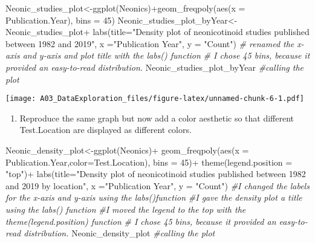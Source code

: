 \documentclass[
]{article}
\newenvironment{Shaded}{\begin{snugshade}}{\end{snugshade}}
\newcommand{\AttributeTok}[1]{\textcolor[rgb]{0.77,0.63,0.00}{#1}}
\newcommand{\CommentTok}[1]{\textcolor[rgb]{0.56,0.35,0.01}{\textit{#1}}}
\newcommand{\DecValTok}[1]{\textcolor[rgb]{0.00,0.00,0.81}{#1}}
\newcommand{\FunctionTok}[1]{\textcolor[rgb]{0.00,0.00,0.00}{#1}}
\newcommand{\NormalTok}[1]{#1}
\newcommand{\OtherTok}[1]{\textcolor[rgb]{0.56,0.35,0.01}{#1}}
\newcommand{\SpecialCharTok}[1]{\textcolor[rgb]{0.00,0.00,0.00}{#1}}
\newcommand{\StringTok}[1]{\textcolor[rgb]{0.31,0.60,0.02}{#1}}
\providecommand{\tightlist}{%
  \setlength{\itemsep}{0pt}\setlength{\parskip}{0pt}}
\begin{document}
\begin{Shaded}
\begin{Highlighting}[]
\NormalTok{Neonic\_studies\_plot}\OtherTok{\textless{}{-}}\FunctionTok{ggplot}\NormalTok{(Neonics)}\SpecialCharTok{+}\FunctionTok{geom\_freqpoly}\NormalTok{(}\FunctionTok{aes}\NormalTok{(}\AttributeTok{x =}\NormalTok{ Publication.Year), }\AttributeTok{bins =} \DecValTok{45}\NormalTok{)}
\NormalTok{Neonic\_studies\_plot\_byYear}\OtherTok{\textless{}{-}}\NormalTok{Neonic\_studies\_plot}\SpecialCharTok{+}
  \FunctionTok{labs}\NormalTok{(}\AttributeTok{title=}\StringTok{"Density plot of neonicotinoid studies published between 1982 and 2019"}\NormalTok{,}
  \AttributeTok{x =}\StringTok{"Publication Year"}\NormalTok{, }\AttributeTok{y =} \StringTok{"Count"}\NormalTok{)}
\CommentTok{\# renamed the x{-}axis and y{-}axis and plot title with the labs() function}
\CommentTok{\# I chose 45 bins, because it provided an easy{-}to{-}read distribution.}
\NormalTok{Neonic\_studies\_plot\_byYear }\CommentTok{\#calling the plot}
\end{Highlighting}
\end{Shaded}

\texttt{[image: A03\_DataExploration\_files/figure-latex/unnamed-chunk-6-1.pdf]}

\begin{enumerate}
\def\labelenumi{\arabic{enumi}.}
\setcounter{enumi}{9}
\tightlist
\item
  Reproduce the same graph but now add a color aesthetic so that
  different Test.Location are displayed as different colors.
\end{enumerate}

\begin{Shaded}
\begin{Highlighting}[]
\NormalTok{Neonic\_density\_plot}\OtherTok{\textless{}{-}}\FunctionTok{ggplot}\NormalTok{(Neonics)}\SpecialCharTok{+}
  \FunctionTok{geom\_freqpoly}\NormalTok{(}\FunctionTok{aes}\NormalTok{(}\AttributeTok{x =}\NormalTok{ Publication.Year,}\AttributeTok{color=}\NormalTok{Test.Location), }\AttributeTok{bins =} \DecValTok{45}\NormalTok{)}\SpecialCharTok{+} 
  \FunctionTok{theme}\NormalTok{(}\AttributeTok{legend.position =} \StringTok{"top"}\NormalTok{)}\SpecialCharTok{+}
  \FunctionTok{labs}\NormalTok{(}\AttributeTok{title=}\StringTok{"Density plot of neonicotinoid studies published between 1982 and 2019 by location"}\NormalTok{,}
  \AttributeTok{x =}\StringTok{"Publication Year"}\NormalTok{, }\AttributeTok{y =} \StringTok{"Count"}\NormalTok{)}
\CommentTok{\#I changed the labels for the x{-}axis and y{-}axis using the labs()function}
\CommentTok{\#I gave the density plot a title using the labs() function}
\CommentTok{\#I moved the legend to the top with the theme(legend.position) function}
\CommentTok{\# I chose 45 bins, because it provided an easy{-}to{-}read distribution.}
\NormalTok{Neonic\_density\_plot }\CommentTok{\#calling the plot}
\end{Highlighting}
\end{Shaded}
\end{document}
